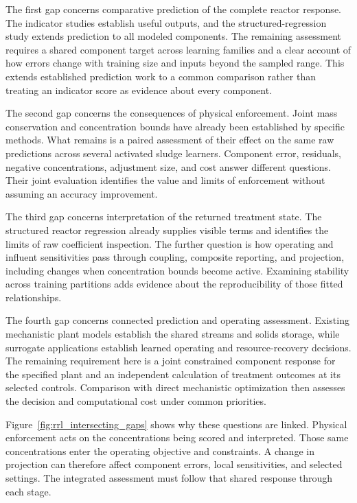 The first gap concerns comparative prediction of the complete reactor response. The indicator studies establish useful outputs, and the structured-regression study extends prediction to all modeled components. The remaining assessment requires a shared component target across learning families and a clear account of how errors change with training size and inputs beyond the sampled range. This extends established prediction work to a common comparison rather than treating an indicator score as evidence about every component.

The second gap concerns the consequences of physical enforcement. Joint mass conservation and concentration bounds have already been established by specific methods. What remains is a paired assessment of their effect on the same raw predictions across several activated sludge learners. Component error, residuals, negative concentrations, adjustment size, and cost answer different questions. Their joint evaluation identifies the value and limits of enforcement without assuming an accuracy improvement.

The third gap concerns interpretation of the returned treatment state. The structured reactor regression already supplies visible terms and identifies the limits of raw coefficient inspection. The further question is how operating and influent sensitivities pass through coupling, composite reporting, and projection, including changes when concentration bounds become active. Examining stability across training partitions adds evidence about the reproducibility of those fitted relationships.

The fourth gap concerns connected prediction and operating assessment. Existing mechanistic plant models establish the shared streams and solids storage, while surrogate applications establish learned operating and resource-recovery decisions. The remaining requirement here is a joint constrained component response for the specified plant and an independent calculation of treatment outcomes at its selected controls. Comparison with direct mechanistic optimization then assesses the decision and computational cost under common priorities.

Figure~\ref{fig:rrl_intersecting_gaps} shows why these questions are linked. Physical enforcement acts on the concentrations being scored and interpreted. Those same concentrations enter the operating objective and constraints. A change in projection can therefore affect component errors, local sensitivities, and selected settings. The integrated assessment must follow that shared response through each stage.

